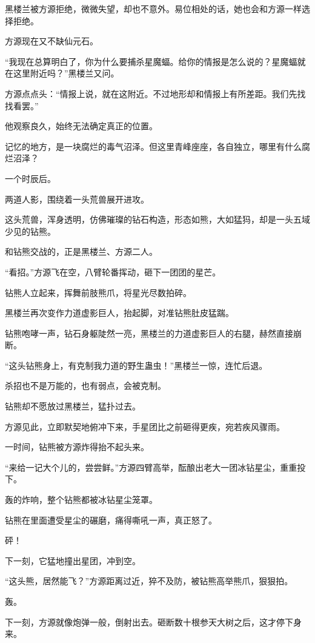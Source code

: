 \begin{this_body}
黑楼兰被方源拒绝，微微失望，却也不意外。易位相处的话，她也会和方源一样选择拒绝。

方源现在又不缺仙元石。

“我现在总算明白了，你为什么要捕杀星魔蝠。给你的情报是怎么说的？星魔蝠就在这里附近吗？”黑楼兰又问。

方源点点头：“情报上说，就在这附近。不过地形却和情报上有所差距。我们先找找看罢。”

他观察良久，始终无法确定真正的位置。

记忆的地方，是一块腐烂的毒气沼泽。但这里青峰座座，各自独立，哪里有什么腐烂沼泽？

一个时辰后。

两道人影，围绕着一头荒兽展开进攻。

这头荒兽，浑身透明，仿佛璀璨的钻石构造，形态如熊，大如猛犸，却是一头五域少见的钻熊。

和钻熊交战的，正是黑楼兰、方源二人。

“看招。”方源飞在空，八臂轮番挥动，砸下一团团的星芒。

钻熊人立起来，挥舞前肢熊爪，将星光尽数拍碎。

黑楼兰再次变作力道虚影巨人，抬起脚，对准钻熊肚皮猛踹。

钻熊咆哮一声，钻石身躯陡然一亮，黑楼兰的力道虚影巨人的右腿，赫然直接崩断。

“这头钻熊身上，有克制我力道的野生蛊虫！”黑楼兰一惊，连忙后退。

杀招也不是万能的，也有弱点，会被克制。

钻熊却不愿放过黑楼兰，猛扑过去。

方源见此，立即默契地俯冲下来，手星团比之前砸得更疾，宛若疾风骤雨。

一时间，钻熊被方源炸得抬不起头来。

“来给一记大个儿的，尝尝鲜。”方源四臂高举，酝酿出老大一团冰钻星尘，重重投下。

轰的炸响，整个钻熊都被冰钻星尘笼罩。

钻熊在里面遭受星尘的碾磨，痛得嘶吼一声，真正怒了。

砰！

下一刻，它猛地撞出星团，冲到空。

“这头熊，居然能飞？”方源距离过近，猝不及防，被钻熊高举熊爪，狠狠拍。

轰。

下一刻，方源就像炮弹一般，倒射出去。砸断数十根参天大树之后，这才停下身来。


\end{this_body}
